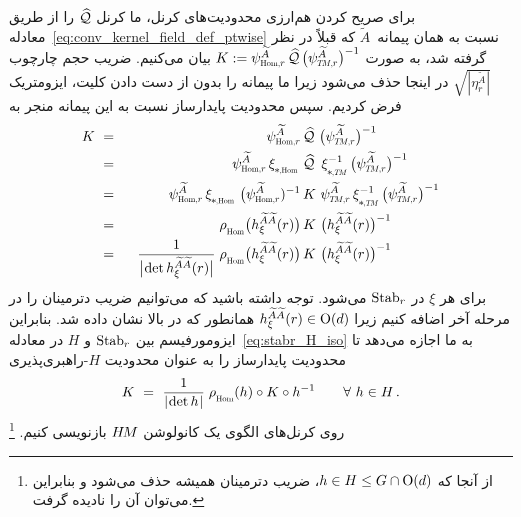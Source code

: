 برای صریح کردن هم‌ارزی محدودیت‌های کرنل، ما کرنل $\widehat{\mathcal{Q}}$ را از طریق معادله~\eqref{eq:conv_kernel_field_def_ptwise} نسبت به همان پیمانه~$\widetilde{A}$ که قبلاً در نظر گرفته شد، به صورت
$K := \psiHomr^{\widetilde{A}}\, \Qhat\, \big(\psiTMr^{\widetilde{A}} \big)^{-1}$ بیان می‌کنیم.
ضریب حجم چارچوب $\sqrt{|\eta_r^{\widetilde{A}}|}$ در اینجا حذف می‌شود زیرا ما پیمانه را بدون از دست دادن کلیت، ایزومتریک فرض کردیم.
سپس محدودیت پایدارساز نسبت به این پیمانه منجر به
\begin{alignat}{3}
	K
	\ &=&\ \ \psiHomr^{\widetilde{A}}\, &\Qhat\ \big(\psiTMr^{\widetilde{A}} \big)^{-1} \notag \\
	\ &=&\ \ \psiHomr^{\widetilde{A}}\, \dxiHom\, &\Qhat\,\ \dxiTM^{-1}\, \big(\psiTMr^{\widetilde{A}} \big)^{-1} \notag \\
	\ &=&\ \ \psiHomr^{\widetilde{A}}\, \dxiHom\, \big(\psiHomr^{\widetilde{A}})^{-1}\, &K\ \psiTMr^{\widetilde{A}}\, \dxiTM^{-1}\, \big(\psiTMr^{\widetilde{A}} \big)^{-1} \notag \\
	\ &=&\ \ \rhoHom\big( h_\xi^{\widetilde{A}\widetilde{A}}(r) \big)\, &K\ \big( h_\xi^{\widetilde{A}\widetilde{A}}(r) \big)^{-1} \notag \\
	\ &=&\ \ \frac{1}{\big|\mkern-2mu \det h_\xi^{\widetilde{A}\widetilde{A}}(r) \big|} \;
	\rhoHom\big( h_\xi^{\widetilde{A}\widetilde{A}}(r) \big)\, &K\ \big( h_\xi^{\widetilde{A}\widetilde{A}}(r) \big)^{-1}
\end{alignat}
برای هر $\xi$ در $\operatorname{Stab}_{r}$ می‌شود.
توجه داشته باشید که می‌توانیم ضریب دترمینان را در مرحله آخر اضافه کنیم زیرا $h_\xi^{\widetilde{A}\widetilde{A}}(r) \in \operatorname{O}(d)$ همانطور که در بالا نشان داده شد.
بنابراین ایزومورفیسم بین $\operatorname{Stab}_{r}$ و $H$ در معادله~\eqref{eq:stabr_H_iso} به ما اجازه می‌دهد تا محدودیت پایدارساز را به عنوان محدودیت $H$-راهبری‌پذیری
\begin{align}
	K\ =\ \frac{1}{|\mkern-2mu \det h \mkern1mu|}\; \rhoHom(h) \circ K \circ h^{-1} \qquad \forall\ h \in H \,.
\end{align}
روی کرنل‌های الگوی یک کانولوشن $H\mkern-2.5muM$ بازنویسی کنیم.%
\footnote{
	از آنجا که $h\in H \leq G\cap\operatorname{O}(d)$، ضریب دترمینان همیشه حذف می‌شود و بنابراین می‌توان آن را نادیده گرفت.
}



